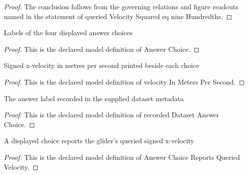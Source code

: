 \begin{proof}
  The conclusion follows from the governing relations and figure readouts named in the statement of queried Velocity Squared eq nine Hundredths.
\end{proof}
\begin{definition}
  \label{def:physics:phyx-mini-0813:phyxminiproblems-problemphyxmini0813-answerchoice}
  Labels of the four displayed answer choices
\end{definition}
\begin{proof}
  This is the declared model definition of Answer Choice.
\end{proof}
\begin{definition}
  \label{def:physics:phyx-mini-0813:phyxminiproblems-problemphyxmini0813-answerchoice-velocityinmeterspersecond}
  Signed x-velocity in metres per second printed beside each choice
\end{definition}
\begin{proof}
  This is the declared model definition of velocity In Meters Per Second.
\end{proof}
\begin{definition}
  \label{def:physics:phyx-mini-0813:phyxminiproblems-problemphyxmini0813-recordeddatasetanswerchoice}
  The answer label recorded in the supplied dataset metadata
\end{definition}
\begin{proof}
  This is the declared model definition of recorded Dataset Answer Choice.
\end{proof}
\begin{definition}
  \label{def:physics:phyx-mini-0813:phyxminiproblems-problemphyxmini0813-answerchoicereportsqueriedvelocity}
  A displayed choice reports the glider's queried signed x-velocity
\end{definition}
\begin{proof}
  This is the declared model definition of Answer Choice Reports Queried Velocity.
\end{proof}

